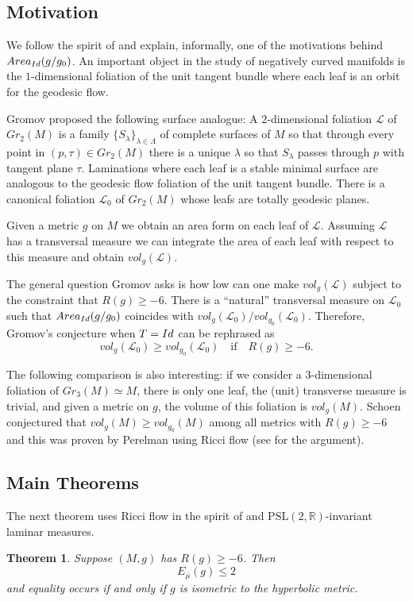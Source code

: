 \documentclass[11pt]{amsart}
\def\R{\mathbb R}
\newtheorem{thm}{Theorem}[section]
\theoremstyle{remark}
\theoremstyle{definition}
\begin{document}
{	\subsection{Motivation} We follow the spirit of \cite{gromov,gromov2} and explain, informally, one of the  motivations behind ${\rm Area}_{\rm Id}(g/g_0)$. An important object in the study of negatively curved manifolds is the $1$-dimensional foliation of the unit tangent bundle where each leaf is {an orbit for the}  geodesic flow. 
	
	Gromov proposed the following surface analogue: A $2$-dimensional foliation $\mathcal L$ of $Gr_2(M)$ is a family $\{S_{\lambda}\}_{\lambda\in\Lambda}$ of complete surfaces of $M$ so that through every point in $(p,\tau)\in Gr_2(M)$ there is a unique $\lambda$ so that $S_\lambda$ passes through $p$ with tangent plane $\tau$. Laminations where each leaf is a stable minimal surface are analogous to the geodesic flow foliation of the unit tangent bundle. There is a canonical foliation $\mathcal L_0$ of $Gr_2(M)$ whose leafs are totally geodesic planes. 
	
	Given a metric $g$ on $M$ we obtain an area form on each leaf of $\mathcal L$.  Assuming   $\mathcal L$ has a transversal measure  we can integrate the area of each leaf with respect to this measure and obtain $vol_g(\mathcal L)$. 
	
	The general question Gromov asks is how low can {one} make $vol_g(\mathcal L)$ subject to the constraint that $R(g)\geq -6$. There is a  ``natural''  transversal measure on  $\mathcal L_0$ such that  ${\rm Area}_{{\rm Id}}(g/g_0)$ coincides with $vol_g(\mathcal L_0)/vol_{g_0}(\mathcal L_0)$. Therefore, Gromov's conjecture when $T={\rm Id}$ can be rephrased as $$vol_g(\mathcal L_0)\geq vol_{g_0}(\mathcal L_0)\quad\mbox{if}\quad R(g)\geq -6.$$
	
	The following comparison is also interesting: if we consider a $3$-dimensional foliation of $Gr_3(M)\simeq M$, there is only one leaf, the (unit) transverse measure is trivial, and given a metric on $g$, the volume of this foliation is  $vol_g(M)$. Schoen conjectured that  $vol_g(M)\geq vol_{g_0}(M)$ among all metrics with $R(g)\geq -6$ and this was proven by Perelman using Ricci flow (see \cite{anderson} for the argument).
	
	
	\subsection{Main Theorems}
	The next theorem uses Ricci flow in the spirit of  \cite{bben, marques-neves} and $\text {PSL}(2,\R)$-invariant laminar measures.
	\begin{thm}\label{mse.thm} Suppose $(M,g)$ has $R(g)\geq -6$. Then $${E_{\bar\mu}(g)\leq 2}$$ and equality occurs if and only if $g$ is isometric to the hyperbolic metric.
	\end{thm}
	
}
\end{document}
